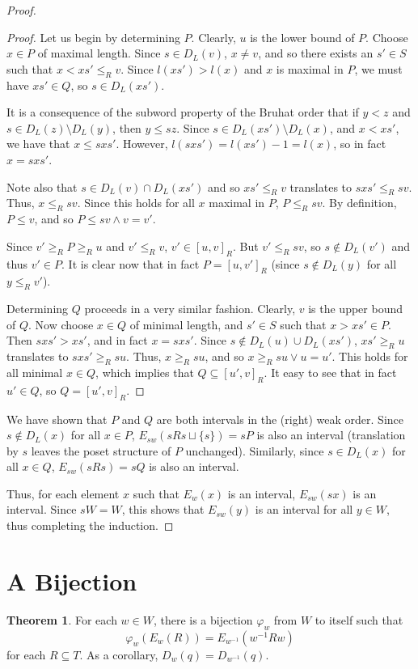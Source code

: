 \documentclass[10pt]{amsart}
\theoremstyle{definition}
\theoremstyle{definition}
\newtheorem{theorem}{Theorem}
\begin{document}
\begin{proof}
\begin{proof}
Let us begin by determining $P$. Clearly, $u$ is the lower bound of $P$. Choose $x \in P$ of maximal length. Since $s \in D_L(v)$, $x \neq v$, and so there exists an $s' \in S$ such that $x < xs' \leq_R v$. Since $l(xs') > l(x)$ and $x$ is maximal in $P$, we must have $xs' \in Q$, so $s \in D_L(xs')$.

It is a consequence of the subword property of the Bruhat order that if $y < z$ and $s \in D_L(z) \setminus D_L(y)$, then $y \leq sz$. Since $s \in D_L(xs') \setminus D_L(x)$, and $x < xs'$, we have that $x \leq sxs'$. However, $l(sxs') = l(xs') - 1 = l(x)$, so in fact $x = sxs'$.

Note also that $s \in D_L(v) \cap D_L(xs')$ and so $xs' \leq_R v$ translates to $sxs' \leq_R sv$. Thus, $x \leq_R sv$. Since this holds for all $x$ maximal in $P$, $P \leq_R sv$. By definition, $P \leq v$, and so $P \leq sv \land v = v'$.

Since $v' \geq_R P \geq_R u$ and $v' \leq_R v$, $v' \in [u, v]_R$. But $v' \leq_R sv$, so $s \notin D_L(v')$ and thus $v' \in P$. It is clear now that in fact $P = [u, v']_R$ (since $s \notin D_L(y)$ for all $y \leq_R v'$).

Determining $Q$ proceeds in a very similar fashion. Clearly, $v$ is the upper bound of $Q$. Now choose $x \in Q$ of minimal length, and $s' \in S$ such that $x > xs' \in P$. Then $sxs' > xs'$, and in fact $x = sxs'$. Since $s \notin D_L(u) \cup D_L(xs')$, $xs' \geq_R u$ translates to $sxs' \geq_R su$. Thus, $x \geq_R su$, and so $x \geq_R su \lor u = u'$. This holds for all minimal $x \in Q$, which implies that $Q \subseteq [u', v]_R$. It easy to see that in fact $u' \in Q$, so $Q = [u', v]_R$.
\end{proof}

We have shown that $P$ and $Q$ are both intervals in the (right) weak order. Since $s \notin D_L(x)$ for all $x \in P$, $E_{sw}(sRs \sqcup \{s\}) = sP$ is also an interval (translation by $s$ leaves the poset structure of $P$ unchanged). Similarly, since $s \in D_L(x)$ for all $x \in Q$, $E_{sw}(sRs) = sQ$ is also an interval.

Thus, for each element $x$ such that $E_w(x)$ is an interval, $E_{sw}(sx)$ is an interval. Since $sW = W$, this shows that $E_{sw}(y)$ is an interval for all $y \in W$, thus completing the induction.
\end{proof}

\section{A Bijection}
\begin{theorem}
For each $w \in W$, there is a bijection $\varphi_w$ from $W$ to itself such that
\[
\varphi_w(E_w(R)) = E_{w^{-1}}(w^{-1}Rw)
\]
for each $R \subseteq T$. As a corollary, $D_w(q) = D_{w^{-1}}(q)$.
\end{theorem}
\end{document}
